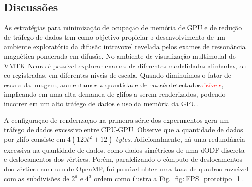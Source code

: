 \subsection{Discussões}


As estratégias para minimização de ocupação de memória de GPU e de redução de tráfego de dados tem como objetivo propiciar o desenvolvimento de um ambiente exploratório da difusão intravoxel revelada pelos exames de ressonância magnética ponderada em difusão. No ambiente de visualização multimodal do VMTK-Neuro \cite{VMTKNeuro} é possível explorar exames de diferentes modalidades alinhadas, ou co-registradas, em diferentes níveis de escala. Quando diminuímos o fator de escala da imagem, aumentamos a quantidade de \textit{voxels} \sout{detectados}\textcolor{red}{visíveis}, implicando em uma alta demanda de glifos a serem renderizados, podendo incorrer em um alto tráfego de dados e uso da memória da GPU.


A configuração de renderização na primeira série dos experimentos gera um tráfego de dados excessivo entre CPU-GPU. Observe que a quantidade de dados por glifo consiste em $4(120t^2 + 12)$ \textit{bytes}. Adicionalmente, há uma redundância excessiva na quantidade de dados, como dados simétricos de uma dODF discreta e deslocamentos dos vértices. Porém, paralelizando o cômputo de deslocamentos dos vértices com uso de OpenMP, foi possível obter uma taxa de quadros razoável com as subdivisões de $2^a$ e $4^a$ ordem como ilustra a Fig. \ref{fig::FPS_prototipo_1}.

